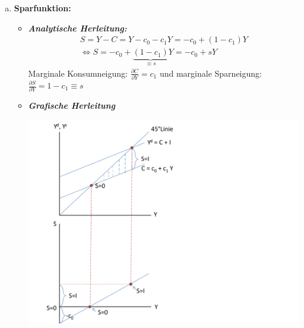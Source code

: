 \documentclass{scrartcl}
\begin{document}
\begin{enumerate}[(a)]
\item \textbf{Sparfunktion:}
\begin{itemize}
\item \textbf{\emph{Analytische Herleitung:}}
    \begin{align*}
      S=Y-C=Y-c_{0}-c_1 Y = -c_{0}+(1-c_1) Y\\
      \Leftrightarrow S = -c_{0} + \underbrace{(1-c_1)}_{\equiv s} Y = -c_{0} + s Y
    \end{align*}
    Marginale Konsumneigung: $\frac{\partial C}{\partial Y} = c_1$ und marginale Sparneigung: $\frac{\partial S}{\partial Y} = 1-c_1\equiv s$
\item \textbf{\emph{Grafische Herleitung}}
\begin{center}
  \includegraphics[width=.6\textwidth]{Bilder/sparfunktion.pdf}\\
\end{center}
\end{itemize}


\end{enumerate}
\end{document}
